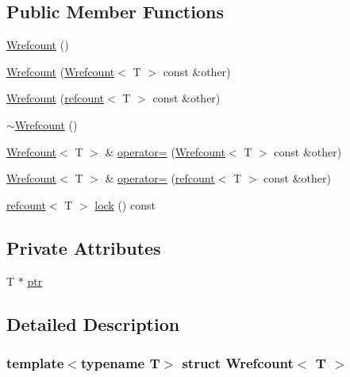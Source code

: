 \subsection*{Public Member Functions}
\begin{DoxyCompactItemize}
\item 
\hyperlink{classWrefcount_a153e40203502de14e21ce10f1e41b29d}{Wrefcount} ()
\item 
\hyperlink{classWrefcount_af0dd24fad728dd9ee62c9d1bbe6a32fb}{Wrefcount} (\hyperlink{classWrefcount}{Wrefcount}$<$ T $>$ const \&other)
\item 
\hyperlink{classWrefcount_a04bc38d0831bd38af4e041b32f972a58}{Wrefcount} (\hyperlink{structrefcount}{refcount}$<$ T $>$ const \&other)
\item 
\hyperlink{classWrefcount_a22b49b818706167fd83655ebb775e04c}{$\sim$\+Wrefcount} ()
\item 
\hyperlink{classWrefcount}{Wrefcount}$<$ T $>$ \& \hyperlink{classWrefcount_af3b3395e2a04cda87a0b4690bedccc72}{operator=} (\hyperlink{classWrefcount}{Wrefcount}$<$ T $>$ const \&other)
\item 
\hyperlink{classWrefcount}{Wrefcount}$<$ T $>$ \& \hyperlink{classWrefcount_a58d65d790944b6f396693d042859c3ec}{operator=} (\hyperlink{structrefcount}{refcount}$<$ T $>$ const \&other)
\item 
\hyperlink{structrefcount}{refcount}$<$ T $>$ \hyperlink{classWrefcount_aeb4ad88c8369bb5d0d8da06e77146944}{lock} () const
\end{DoxyCompactItemize}
\subsection*{Private Attributes}
\begin{DoxyCompactItemize}
\item 
T $\ast$ \hyperlink{classWrefcount_ab82d7e2a3301563eb91d4b18e0b6943f}{ptr}
\end{DoxyCompactItemize}


\subsection{Detailed Description}
\subsubsection*{template$<$typename T$>$\newline
struct Wrefcount$<$ T $>$}




